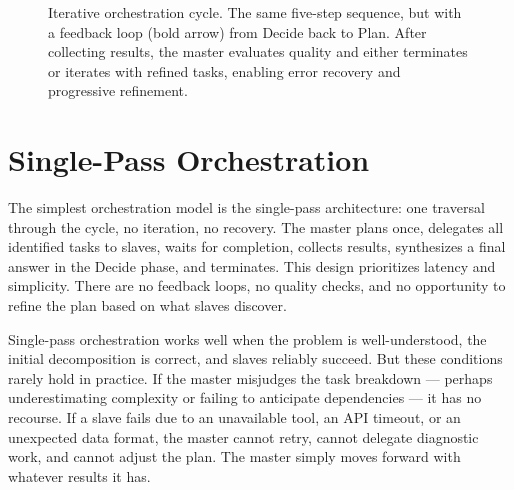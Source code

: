 \begin{figure}[t]
\centering
{}
\caption{Iterative orchestration cycle. The same five-step sequence, but with a feedback loop (bold arrow) from Decide back to Plan. After collecting results, the master evaluates quality and either terminates or iterates with refined tasks, enabling error recovery and progressive refinement.}
\label{fig:orch_iterative}
\end{figure}

\section{Single-Pass Orchestration}\label{sec:single_pass}

The simplest orchestration model is the single-pass architecture: one traversal through the cycle, no iteration, no recovery. The master plans once, delegates all identified tasks to slaves, waits for completion, collects results, synthesizes a final answer in the Decide phase, and terminates. This design prioritizes latency and simplicity. There are no feedback loops, no quality checks, and no opportunity to refine the plan based on what slaves discover.

Single-pass orchestration works well when the problem is well-understood, the initial decomposition is correct, and slaves reliably succeed. But these conditions rarely hold in practice. If the master misjudges the task breakdown — perhaps underestimating complexity or failing to anticipate dependencies — it has no recourse. If a slave fails due to an unavailable tool, an API timeout, or an unexpected data format, the master cannot retry, cannot delegate diagnostic work, and cannot adjust the plan. The master simply moves forward with whatever results it has.

